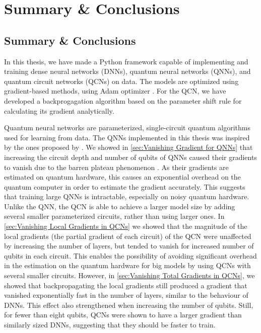 \chapter{Summary \& Conclusions}\label{chap:Conclusion}

\section{Summary \& Conclusions}\label{sec:Summary}
In this thesis, we have made a Python framework capable of implementing and training dense neural networks (DNNs), quantum neural networks (QNNs), and quantum circuit networks (QCNs) on data. The models are optimized using gradient-based methods, using Adam optimizer \cite{kingma2017adam}. For the QCN, we have developed a backprogagation algorithm based on the parameter shift rule for calculating its gradient analytically.

Quantum neural networks are parameterized, single-circuit quantum algorithms used for learning from data. The QNNs implemented in this thesis was inspired by the ones proposed by \citet{abbas2020power}. We showed in \cref{sec:Vanishing Gradient for QNNs} that increasing the circuit depth and number of qubits of QNNs caused their gradients to vanish due to the barren plateau phenomenon \cite{McClean_2018}. As their gradients are estimated on quantum hardware, this causes an exponential overhead on the quantum computer in order to estimate the gradient accurately. This suggests that training large QNNs is intractable, especially on noisy quantum hardware. Unlike the QNN, the QCN is able to achieve a larger model size by adding several smaller parameterized circuits, rather than using larger ones. In \cref{sec:Vanishing Local Gradients in QCNs} we showed that the magnitude of the local gradients (the partial gradient of each circuit) of the QCN were unaffected by increasing the number of layers, but tended to vanish for increased number of qubits in each circuit. This enables the possibility of avoiding significant overhead in the estimation on the quantum hardware for big models by using QCNs with several smaller circuits. However, in \cref{sec:Vanishing Total Gradients in QCNs}, we showed that backpropagating the local gradients still produced a gradient that vanished exponentially fast in the number of layers, similar to the behaviour of DNNs. This effect also strengthened when increasing the number of qubits. Still, for fewer than eight qubits, QCNs were shown to have a larger gradient than similarly sized DNNs, suggesting that they should be faster to train.

